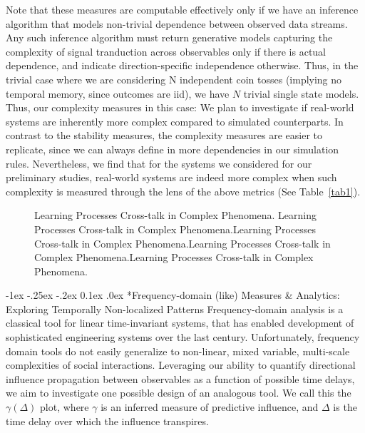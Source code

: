 \documentclass[onecolumn, compsoc,11pt]{IEEEtran}
\makeatletter
\renewcommand\subsection{\@startsection {section}{1}{\z@}%
  {-1ex \@plus -.25ex \@minus -.2ex}%
  {0.1ex \@plus.0ex}%
  {\fontsize{11}{10}\selectfont\bfseries\sffamily\color{DodgerBlue4}}}
\renewcommand{\captionN}[1]{\caption{\color{CadetBlue4!80!black} \sffamily \fontsize{10}{11}\selectfont #1  }}
\makeatother
\begin{document}
Note that these measures are computable effectively only if we have an inference algorithm that models non-trivial dependence between observed data streams. Any such inference algorithm must return generative models capturing the complexity of signal tranduction across observables  only if there is actual dependence, and indicate  direction-specific independence otherwise. Thus, in the trivial case where  we are considering N independent coin tosses (implying no temporal memory, since outcomes are iid), we have $N$ trivial single state models. Thus, our complexity measures in this case: 
We plan to investigate if real-world systems are inherently more complex compared to simulated counterparts. In contrast to the stability measures, the complexity measures are easier to replicate, since we can always define in more dependencies in our simulation rules. Nevertheless, we find that for the systems we considered for our preliminary studies, real-world systems are indeed more complex when such complexity is measured through the lens of the above metrics  (See Table~\ref{tab1}).
%
\begin{figure}
  \tikzexternalenable
  
  
  \vspace{-20pt}
  
  \captionN{Learning Processes Cross-talk in Complex Phenomena. Learning Processes Cross-talk in Complex Phenomena.Learning Processes Cross-talk in Complex Phenomena.Learning Processes Cross-talk in Complex Phenomena.Learning Processes Cross-talk in Complex Phenomena.}\label{figgamma}
\end{figure}
\subsection*{Frequency-domain (like)  Measures \& Analytics: Exploring Temporally Non-localized Patterns}
Frequency-domain analysis is a classical tool for linear time-invariant systems, that has enabled development of sophisticated engineering systems over the last century. Unfortunately,  frequency domain tools do not easily generalize to non-linear, mixed variable, multi-scale complexities of social interactions. Leveraging our ability to quantify directional influence propagation between observables as a function of possible time delays, we aim to investigate one possible design of an analogous tool. We call this the $\gamma(\Delta)$ plot, where $\gamma$ is an inferred measure of predictive influence, and $\Delta$ is the time delay over which the influence transpires.
\end{document}
